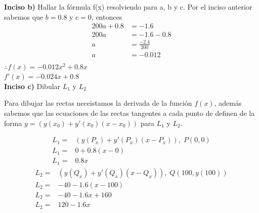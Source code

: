 \textbf{Inciso b)} Hallar la fórmula f(x) resolviendo para a, b y c.
Por el inciso anterior sabemos que $b=0.8$ y $c=0$, entonces
\begin{align*}
	200a+0.8 & =-1.6             \\
	200a     & =-1.6-0.8         \\
	a        & =\frac{-2.4}{200} \\
	a        & =-0.012           \\
\end{align*}
$\therefore f(x)=-0.012x^2+0.8x$\\
$f'(x)=-0.024x+0.8$
\vspace*{1em}
\\
\textbf{Inciso c)} Dibular $L_1$ y $L_2$

Para dibujar las rectas neceistamos la derivada de la función $f(x)$, además sabemos que las ecuaciones de las rectas tangentes a cada punto de definen de la forma $y=(y(x_0)+y'(x_0)(x-x_0))$ para $L_1$ y $L_2$.

\begin{multicols}{2}
	\noindent
	\begin{align*}
		L_1= & (y(P_x)+y'(P_x)(x-P_x)), \;P(0,0) \\
		L_1= & 0+0.8(x-0)                        \\
		L_1= & 0.8x
	\end{align*}
	\columnbreak
	\begin{align*}
		L_2= & (y(Q_x)+y'(Q_x)(x-Q_x)), \;Q(100,y(100)) \\
		L_2= & -40-1.6(x-100)                           \\
		L_2= & -40-1.6x+160                             \\
		L_2= & 120-1.6x                                 \\
	\end{align*}
\end{multicols}

